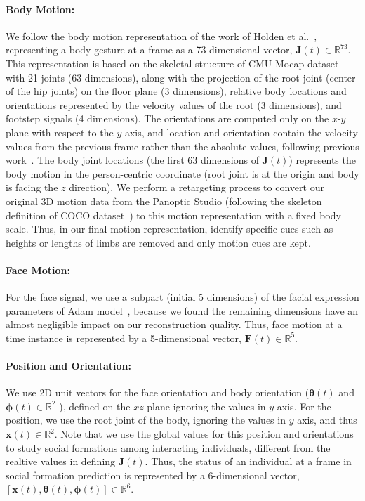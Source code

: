 \paragraph{Body Motion:} We follow the body motion representation of the work of Holden et al.~\cite{holden2016deep}, representing a body gesture at a frame as a 73-dimensional vector, $\mathbf{J}(t) \in \mathbb{R}^{73}$. This representation is based on the skeletal structure of CMU Mocap dataset~\cite{gross2001cmu} with 21 joints (63 dimensions), along with the projection of the root joint (center of the hip joints) on the floor plane (3 dimensions), relative body locations and orientations represented by the velocity values of the root (3 dimensions), and footstep signals (4 dimensions).  The orientations are computed only on the $x$-$y$ plane with respect to the $y$-axis, and location and orientation contain the velocity values from the previous frame rather than the absolute values, following previous work~\cite{jain2016structural, holden2016deep}. The body joint locations (the first 63 dimensions of $\mathbf{J}(t)$) represents the body motion in the person-centric coordinate (root joint is at the origin and body is facing the $z$ direction). We perform a retargeting process to convert our original 3D motion data from the Panoptic Studio (following the skeleton definition of COCO dataset~\cite{coco-14}) to this motion representation with a fixed body scale. Thus, in our final motion representation, identify specific cues such as heights or lengths of limbs are removed and only motion cues are kept.

\paragraph{Face Motion:}  For the face signal, we use a subpart (initial 5 dimensions) of the facial expression parameters of Adam model~\cite{joo2018,cao2014facewarehouse}, because we found the remaining dimensions have an almost negligible impact on our reconstruction quality. Thus, face motion at a time instance is represented by a 5-dimensional vector, $\mathbf{F}(t) \in \mathbb{R}^{5}$.
 
\paragraph{Position and Orientation:} We use 2D unit vectors for the face orientation and body orientation ($\boldsymbol{\theta}(t)$ and $\boldsymbol{\phi}(t) \in \mathbb{R}^{2} $ ), defined on the $xz$-plane ignoring the values in $y$ axis. For the position, we use the root joint of the body, ignoring the values in $y$ axis, and thus $\mathbf{x}(t) \in \mathbb{R}^2$. Note that we use the global values for this position and orientations to study social formations among interacting individuals, different from the realtive values in defining $\mathbf{J}(t)$.  Thus, the status of an individual at a frame in social formation prediction is represented by a 6-dimensional vector, $[\mathbf{x}(t), \boldsymbol{\theta}(t), \boldsymbol{\phi}(t) ] \in \mathbb{R}^6$.

